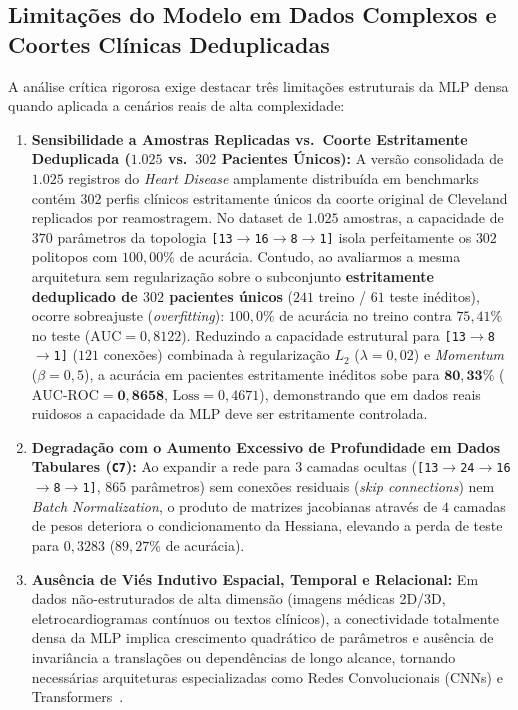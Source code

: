 ﻿\documentclass[runningheads]{llncs}
\begin{document}
\subsection{Limita\c{c}\~{o}es do Modelo em Dados Complexos e Coortes Cl\'{i}nicas Deduplicadas}
A an\'{a}lise cr\'{i}tica rigorosa exige destacar tr\^{e}s limita\c{c}\~{o}es estruturais da MLP densa quando aplicada a cen\'{a}rios reais de alta complexidade:
\begin{enumerate}
    \item \textbf{Sensibilidade a Amostras Replicadas vs.\ Coorte Estritamente Deduplicada ($1.025$ vs.\ $302$ Pacientes \'{U}nicos):} A vers\~{a}o consolidada de $1.025$ registros do \textit{Heart Disease} amplamente distribu\'{i}da em benchmarks cont\'{e}m $302$ perfis cl\'{i}nicos estritamente \'{u}nicos da coorte original de Cleveland replicados por reamostragem. No dataset de $1.025$ amostras, a capacidade de $370$ par\^{a}metros da topologia \texttt{[13$\to$16$\to$8$\to$1]} isola perfeitamente os $302$ politopos com $100{,}00\%$ de acur\'{a}cia. Contudo, ao avaliarmos a mesma arquitetura sem regulariza\c{c}\~{a}o sobre o subconjunto \textbf{estritamente deduplicado de $302$ pacientes \'{u}nicos} ($241$ treino / $61$ teste inéditos), ocorre sobreajuste (\textit{overfitting}): $100{,}0\%$ de acur\'{a}cia no treino contra $75{,}41\%$ no teste ($\text{AUC} = 0{,}8122$). Reduzindo a capacidade estrutural para \texttt{[13$\to$8$\to$1]} ($121$ conex\~{o}es) combinada \`{a} regulariza\c{c}\~{a}o $L_2$ ($\lambda = 0{,}02$) e \textit{Momentum} ($\beta = 0{,}5$), a acur\'{a}cia em pacientes estritamente in\'{e}ditos sobe para $\mathbf{80{,}33\%}$ ($\text{AUC-ROC} = \mathbf{0{,}8658}$, $\text{Loss} = 0{,}4671$), demonstrando que em dados reais ruidosos a capacidade da MLP deve ser estritamente controlada.
    \item \textbf{Degrada\c{c}\~{a}o com o Aumento Excessivo de Profundidade em Dados Tabulares (\texttt{C7}):} Ao expandir a rede para $3$ camadas ocultas (\texttt{[13$\to$24$\to$16$\to$8$\to$1]}, $865$ par\^{a}metros) sem conex\~{o}es residuais (\textit{skip connections}) nem \textit{Batch Normalization}, o produto de matrizes jacobianas através de $4$ camadas de pesos deteriora o condicionamento da Hessiana, elevando a perda de teste para $0{,}3283$ ($89{,}27\%$ de acur\'{a}cia).
    \item \textbf{Aus\^{e}ncia de Vi\'{e}s Indutivo Espacial, Temporal e Relacional:} Em dados n\~{a}o-estruturados de alta dimens\~{a}o (imagens m\'{e}dicas 2D/3D, eletrocardiogramas cont\'{i}nuos ou textos cl\'{i}nicos), a conectividade totalmente densa da MLP implica crescimento quadr\'{a}tico de par\^{a}metros e aus\^{e}ncia de invari\^{a}ncia a transla\c{c}\~{o}es ou depend\^{e}ncias de longo alcance, tornando necess\'{a}rias arquiteturas especializadas como Redes Convolucionais (CNNs) e Transformers~\cite{vaswani2017attention}.
\end{enumerate}



\end{document}
